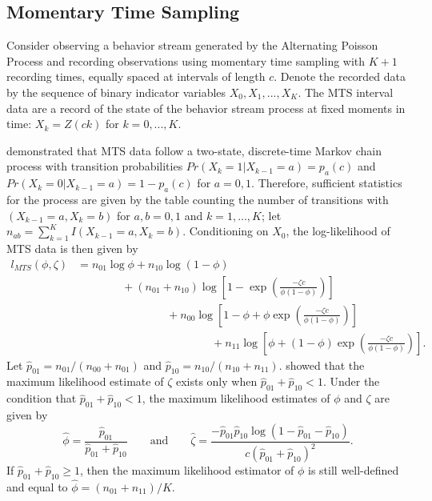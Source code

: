 \documentclass[man, noextraspace, floatsintext]{apa6}\usepackage[]{graphicx}\usepackage[]{color}
\begin{document}
\subsection{Momentary Time Sampling}
\label{subsec:MTS}

Consider observing a behavior stream generated by the Alternating Poisson Process and recording observations using momentary time sampling with $K + 1$ recording times, equally spaced at intervals of length $c$. Denote the recorded data by the sequence of binary indicator variables $X_0,X_1,...,X_K$. The MTS interval data are a record of the state of the behavior stream process at fixed moments in time: $X_k = Z(ck)$ for $k = 0,...,K$. 

\citet{Brown1977estimation} demonstrated that MTS data follow a two-state, discrete-time Markov chain process with transition probabilities $Pr(X_k = 1 | X_{k-1} = a) = p_a(c)$ and $Pr(X_k = 0 | X_{k-1} = a) = 1 - p_a(c)$ for $a = 0,1$. Therefore, sufficient statistics for the process are given by the table counting the number of transitions with $(X_{k-1} = a, X_k = b)$ for $a,b = 0,1$ and $k = 1,...,K$; let $n_{ab} = \sum_{k=1}^K I(X_{k-1} = a, X_k = b)$. Conditioning on $X_0$, the log-likelihood of MTS data is then given by \begin{equation}
\begin{aligned}
\label{eq:MTS_loglik}
l_{MTS}(\phi, \zeta) &= n_{01} \log \phi + n_{10} \log\left(1 - \phi\right) \\
& \qquad \qquad + \left(n_{01} + n_{10}\right) \log \left[1 - \exp\left(\frac{-\zeta c}{\phi (1 - \phi)}\right)\right] \\
& \qquad \qquad \qquad \qquad + n_{00} \log\left[1 - \phi + \phi \exp\left(\frac{-\zeta c}{\phi (1 - \phi)}\right)\right]\\
& \qquad \qquad \qquad \qquad \qquad \qquad + n_{11}\log\left[\phi + \left(1 - \phi\right)\exp\left(\frac{-\zeta c}{\phi (1 - \phi)}\right)\right].
\end{aligned}
\end{equation}
Let $\hat{p}_{01} = n_{01}/ \left(n_{00} + n_{01}\right)$ and $\hat{p}_{10} = n_{10} / \left(n_{10} + n_{11}\right)$. \citet{Brown1977estimation} showed that the maximum likelihood estimate of $\zeta$ exists only when $\hat{p}_{01} + \hat{p}_{10} < 1$. Under the condition that $\hat{p}_{01} + \hat{p}_{10} < 1$, the maximum likelihood estimates of $\phi$ and $\zeta$ are given by 
\begin{equation}
\label{eq:MTS_mle}
\hat\phi = \frac{\hat{p}_{01}}{\hat{p}_{01} + \hat{p}_{10}} \qquad \text{and} \qquad
\hat\zeta = \frac{-\hat{p}_{01} \hat{p}_{10} \log(1 - \hat{p}_{01} - \hat{p}_{10})}{c \left(\hat{p}_{01} + \hat{p}_{10}\right)^2}.
\end{equation}
If $\hat{p}_{01} + \hat{p}_{10} \geq 1$, then the maximum likelihood estimator of $\phi$ is still well-defined and equal to $\hat\phi = \left(n_{01} + n_{11}\right) / K$. 
\end{document}
